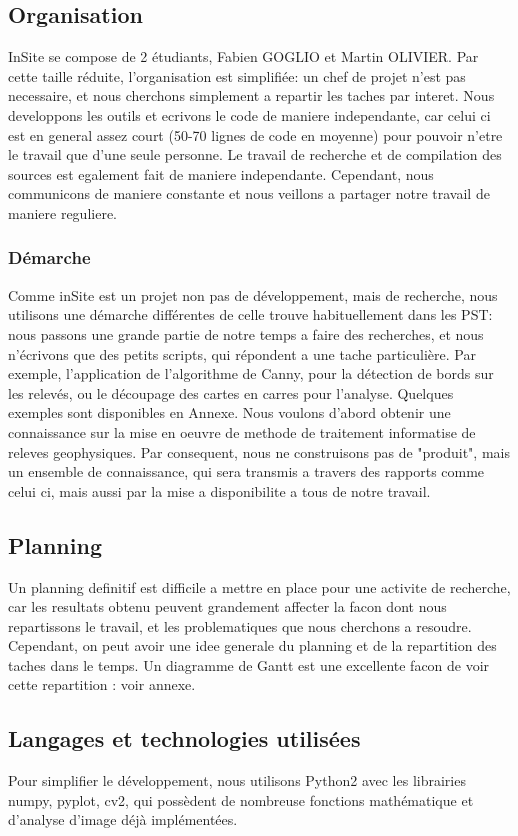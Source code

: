 \documentclass[a4paper, 12pt, titlepage, oneside, french]{article}
\begin{document}
	\subsection{Organisation}
	InSite se compose de 2 étudiants, Fabien GOGLIO et Martin OLIVIER. Par cette taille réduite, l'organisation est simplifiée: un chef de projet n'est pas necessaire, et nous cherchons simplement a repartir les taches par interet. Nous developpons les outils et ecrivons le code de maniere independante, car celui ci est en general assez court (50-70 lignes de code en moyenne) pour pouvoir n'etre le travail que d'une seule personne. Le travail de recherche et de compilation des sources est egalement fait de maniere independante. Cependant, nous communicons de maniere constante et nous veillons a partager notre travail de maniere reguliere.   
	\subsubsection{Démarche}
	Comme inSite est un projet non pas de développement, mais de recherche, nous utilisons une démarche différentes de celle trouve habituellement dans les PST: nous passons une grande partie de notre temps a faire des recherches, et nous n'écrivons que des petits scripts, qui répondent a une tache particulière. Par exemple, l'application de l'algorithme de Canny, pour la détection de bords sur les relevés, ou le découpage des cartes en carres pour l'analyse. Quelques exemples sont disponibles en Annexe. Nous voulons d'abord obtenir une connaissance sur la mise en oeuvre de methode de traitement informatise de releves geophysiques. Par consequent, nous ne construisons pas de "produit", mais un ensemble de connaissance, qui sera transmis a travers des rapports comme celui ci, mais aussi par la mise a disponibilite a tous de notre travail.
	\subsection{Planning}
	Un planning definitif est difficile a mettre en place pour une activite de recherche, car les resultats obtenu peuvent grandement affecter la facon dont nous repartissons le travail, et les problematiques que nous cherchons a resoudre. Cependant, on peut avoir une idee generale du planning et de la repartition des taches dans le temps. Un diagramme de Gantt est une excellente facon de voir cette repartition : voir annexe.
\newpage

	\subsection{Langages et technologies utilisées}
	Pour simplifier le développement, nous utilisons Python2 avec les librairies numpy, pyplot, cv2, qui possèdent de nombreuse fonctions mathématique et d'analyse d'image déjà implémentées.
	\newpage
\end{document}
